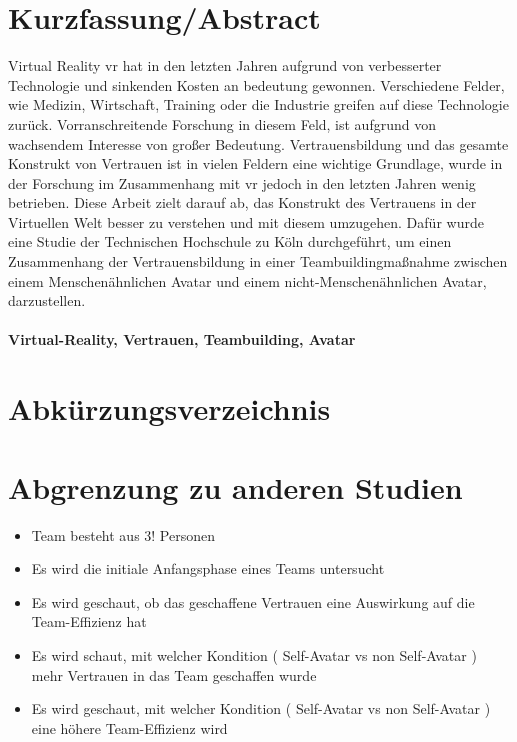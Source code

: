 \documentclass[a4paper,11pt]{article}%
\renewcommand{\\}{\vspace*{0.5\baselineskip} \newline}
\begin{document}
	\section*{Kurzfassung/Abstract}
	Virtual Reality \ac{vr} hat in den letzten Jahren aufgrund von verbesserter Technologie und sinkenden Kosten an bedeutung gewonnen. Verschiedene Felder, wie Medizin, Wirtschaft, Training oder die Industrie greifen auf diese Technologie zurück. Vorranschreitende Forschung in diesem Feld, ist aufgrund von wachsendem Interesse von großer Bedeutung. Vertrauensbildung und das gesamte Konstrukt von Vertrauen ist in vielen Feldern eine wichtige Grundlage, wurde in der Forschung im Zusammenhang mit \ac{vr} jedoch in den letzten Jahren wenig betrieben. Diese Arbeit zielt darauf ab, das Konstrukt des Vertrauens in der Virtuellen Welt besser zu verstehen und mit diesem umzugehen. Dafür wurde eine Studie der Technischen Hochschule zu Köln durchgeführt, um einen Zusammenhang der Vertrauensbildung in einer Teambuildingmaßnahme zwischen einem Menschenähnlichen Avatar und einem nicht-Menschenähnlichen Avatar, darzustellen.
	
	\paragraph{Virtual-Reality, Vertrauen, Teambuilding, Avatar}
	\newpage
	\tableofcontents
	\newpage
	
	\section*{Abkürzungsverzeichnis}
	
	
	\newpage
	
	\section{Abgrenzung zu anderen Studien}
	\begin{itemize}
	\item{Team besteht aus 3! Personen}
	\item{Es wird die initiale Anfangsphase eines Teams untersucht}
	
	\item{Es wird geschaut, ob das geschaffene Vertrauen eine Auswirkung auf die Team-Effizienz hat}
	\item{Es wird schaut, mit welcher Kondition ( Self-Avatar vs non Self-Avatar ) mehr Vertrauen in das Team geschaffen wurde}
	\item{Es wird geschaut, mit welcher Kondition ( Self-Avatar vs non Self-Avatar ) eine höhere Team-Effizienz wird}
	\end{itemize}		
	
\end{document}
